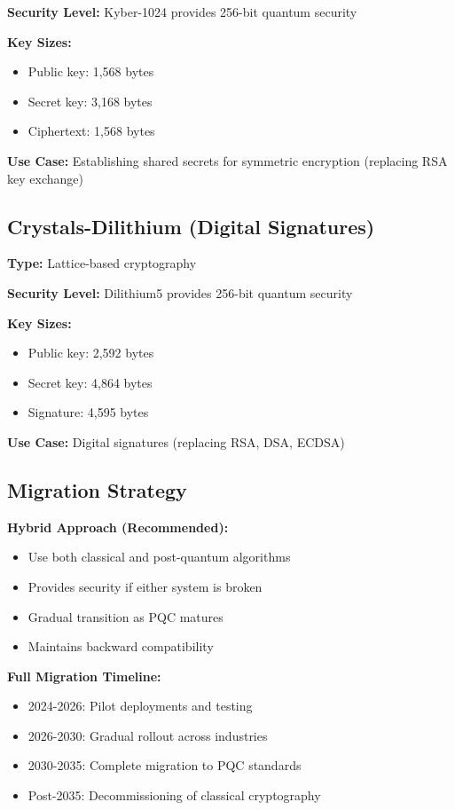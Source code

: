 \documentclass[12pt,oneside]{book}
\begin{document}
\textbf{Security Level:} Kyber-1024 provides 256-bit quantum security

\textbf{Key Sizes:}
\begin{itemize}
\item Public key: 1,568 bytes
\item Secret key: 3,168 bytes
\item Ciphertext: 1,568 bytes
\end{itemize}

\textbf{Use Case:} Establishing shared secrets for symmetric encryption (replacing RSA key exchange)

\subsection{Crystals-Dilithium (Digital Signatures)}

\textbf{Type:} Lattice-based cryptography

\textbf{Security Level:} Dilithium5 provides 256-bit quantum security

\textbf{Key Sizes:}
\begin{itemize}
\item Public key: 2,592 bytes
\item Secret key: 4,864 bytes
\item Signature: 4,595 bytes
\end{itemize}

\textbf{Use Case:} Digital signatures (replacing RSA, DSA, ECDSA)

\subsection{Migration Strategy}

\textbf{Hybrid Approach (Recommended):}
\begin{itemize}
\item Use both classical and post-quantum algorithms
\item Provides security if either system is broken
\item Gradual transition as PQC matures
\item Maintains backward compatibility
\end{itemize}

\textbf{Full Migration Timeline:}
\begin{itemize}
\item 2024-2026: Pilot deployments and testing
\item 2026-2030: Gradual rollout across industries
\item 2030-2035: Complete migration to PQC standards
\item Post-2035: Decommissioning of classical cryptography
\end{itemize}
\end{document}
